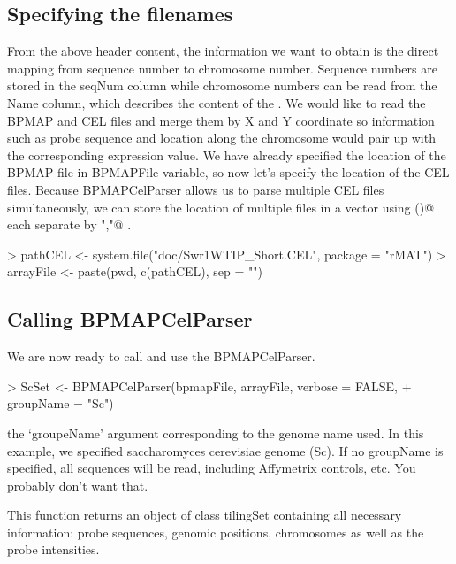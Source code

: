 \documentclass[11pt]{article}
\begin{document}
\subsection*{Specifying the filenames}
From the above header content, the information we want to obtain is the direct mapping from sequence number to chromosome number. Sequence numbers are stored in the seqNum column while chromosome numbers can be read from the Name column, which describes the content of the \verb@sequence@.
\newline
	We would like to read the BPMAP and CEL files and merge them by X and Y coordinate so information such as probe sequence and location along the chromosome would pair up with the corresponding expression value. 
\newline
	We have already specified the location of the BPMAP file in BPMAPFile variable, so now let's specify the location of the CEL files. Because BPMAPCelParser allows us to parse multiple CEL files simultaneously, we can store the location of multiple files in a vector using \verb@c()@
 each separate by \verb@","@
. 
\begin{Schunk}
\begin{Sinput}
> pathCEL <- system.file("doc/Swr1WTIP_Short.CEL", package = "rMAT")
> arrayFile <- paste(pwd, c(pathCEL), sep = "")
\end{Sinput}
\end{Schunk}

\subsection*{Calling BPMAPCelParser}
We are now ready to call and use the BPMAPCelParser. 
\\
 
\begin{Schunk}
\begin{Sinput}
> ScSet <- BPMAPCelParser(bpmapFile, arrayFile, verbose = FALSE, 
+     groupName = "Sc")
\end{Sinput}
\end{Schunk}

the `groupeName' argument corresponding to the genome name used. In this example, we specified saccharomyces cerevisiae genome (Sc). If no groupName is specified, all sequences will be read, including Affymetrix controls, etc. You probably don't want that.


This function returns an object of class tilingSet containing all necessary information: probe sequences, genomic positions, chromosomes as well as the probe intensities. 
\end{document}
